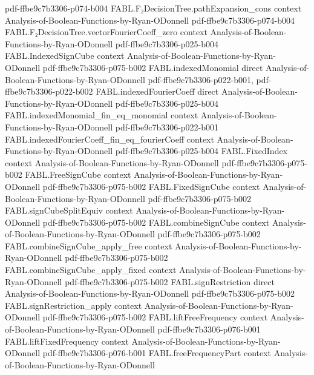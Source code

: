 \begin{theorem}
  {pdf-ffbe9c7b3306-p074-b004}
\proofstep
  {FABL.F₂DecisionTree.pathExpansion_cons}
  {context}
  {Analysis-of-Boolean-Functions-by-Ryan-ODonnell}
  {pdf-ffbe9c7b3306-p074-b004}
\proofstep
  {FABL.F₂DecisionTree.vectorFourierCoeff_zero}
  {context}
  {Analysis-of-Boolean-Functions-by-Ryan-ODonnell}
  {pdf-ffbe9c7b3306-p025-b004}
\proofstep
  {FABL.IndexedSignCube}
  {context}
  {Analysis-of-Boolean-Functions-by-Ryan-ODonnell}
  {pdf-ffbe9c7b3306-p075-b002}
\proofstep
  {FABL.indexedMonomial}
  {direct}
  {Analysis-of-Boolean-Functions-by-Ryan-ODonnell}
  {pdf-ffbe9c7b3306-p022-b001,
    pdf-ffbe9c7b3306-p022-b002}
\proofstep
  {FABL.indexedFourierCoeff}
  {direct}
  {Analysis-of-Boolean-Functions-by-Ryan-ODonnell}
  {pdf-ffbe9c7b3306-p025-b004}
\proofstep
  {FABL.indexedMonomial_fin_eq_monomial}
  {context}
  {Analysis-of-Boolean-Functions-by-Ryan-ODonnell}
  {pdf-ffbe9c7b3306-p022-b001}
\proofstep
  {FABL.indexedFourierCoeff_fin_eq_fourierCoeff}
  {context}
  {Analysis-of-Boolean-Functions-by-Ryan-ODonnell}
  {pdf-ffbe9c7b3306-p025-b004}
\proofstep
  {FABL.FixedIndex}
  {context}
  {Analysis-of-Boolean-Functions-by-Ryan-ODonnell}
  {pdf-ffbe9c7b3306-p075-b002}
\proofstep
  {FABL.FreeSignCube}
  {context}
  {Analysis-of-Boolean-Functions-by-Ryan-ODonnell}
  {pdf-ffbe9c7b3306-p075-b002}
\proofstep
  {FABL.FixedSignCube}
  {context}
  {Analysis-of-Boolean-Functions-by-Ryan-ODonnell}
  {pdf-ffbe9c7b3306-p075-b002}
\proofstep
  {FABL.signCubeSplitEquiv}
  {context}
  {Analysis-of-Boolean-Functions-by-Ryan-ODonnell}
  {pdf-ffbe9c7b3306-p075-b002}
\proofstep
  {FABL.combineSignCube}
  {context}
  {Analysis-of-Boolean-Functions-by-Ryan-ODonnell}
  {pdf-ffbe9c7b3306-p075-b002}
\proofstep
  {FABL.combineSignCube_apply_free}
  {context}
  {Analysis-of-Boolean-Functions-by-Ryan-ODonnell}
  {pdf-ffbe9c7b3306-p075-b002}
\proofstep
  {FABL.combineSignCube_apply_fixed}
  {context}
  {Analysis-of-Boolean-Functions-by-Ryan-ODonnell}
  {pdf-ffbe9c7b3306-p075-b002}
\proofstep
  {FABL.signRestriction}
  {direct}
  {Analysis-of-Boolean-Functions-by-Ryan-ODonnell}
  {pdf-ffbe9c7b3306-p075-b002}
\proofstep
  {FABL.signRestriction_apply}
  {context}
  {Analysis-of-Boolean-Functions-by-Ryan-ODonnell}
  {pdf-ffbe9c7b3306-p075-b002}
\proofstep
  {FABL.liftFreeFrequency}
  {context}
  {Analysis-of-Boolean-Functions-by-Ryan-ODonnell}
  {pdf-ffbe9c7b3306-p076-b001}
\proofstep
  {FABL.liftFixedFrequency}
  {context}
  {Analysis-of-Boolean-Functions-by-Ryan-ODonnell}
  {pdf-ffbe9c7b3306-p076-b001}
\proofstep
  {FABL.freeFrequencyPart}
  {context}
  {Analysis-of-Boolean-Functions-by-Ryan-ODonnell}

\end{theorem}
